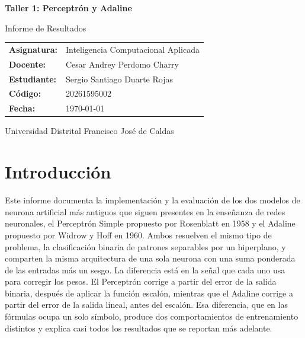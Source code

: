 \documentclass[11pt,letterpaper]{article}
\newcommand{\nombreEstudiante}{Sergio Santiago Duarte Rojas}
\newcommand{\codigoEstudiante}{20261595002}
\newcommand{\nombreDocente}{Cesar Andrey Perdomo Charry}
\newcommand{\nombreAsignatura}{Inteligencia Computacional Aplicada}
\newcommand{\fechaInforme}{\today}
\begin{document}
\begin{titlepage}
    \centering
    \vspace*{2cm}
    {\LARGE \bfseries Taller 1: Perceptrón y Adaline\par}
    \vspace{0.5cm}
    {\large Informe de Resultados\par}
    \vspace{2cm}

    \begin{tabular}{ll}
        \textbf{Asignatura:} & \nombreAsignatura \\
        \textbf{Docente:}    & \nombreDocente \\
        \textbf{Estudiante:} & \nombreEstudiante \\
        \textbf{Código:}     & \codigoEstudiante \\
        \textbf{Fecha:}      & \fechaInforme \\
    \end{tabular}

    \vfill
    Universidad Distrital Francisco José de Caldas
\end{titlepage}

\tableofcontents
\newpage

\section{Introducción}

Este informe documenta la implementación y la evaluación de los dos modelos de neurona artificial más antiguos que siguen presentes en la enseñanza de redes neuronales, el Perceptrón Simple propuesto por Rosenblatt en 1958 y el Adaline propuesto por Widrow y Hoff en 1960. Ambos resuelven el mismo tipo de problema, la clasificación binaria de patrones separables por un hiperplano, y comparten la misma arquitectura de una sola neurona con una suma ponderada de las entradas más un sesgo. La diferencia está en la señal que cada uno usa para corregir los pesos. El Perceptrón corrige a partir del error de la salida binaria, después de aplicar la función escalón, mientras que el Adaline corrige a partir del error de la salida lineal, antes del escalón. Esa diferencia, que en las fórmulas ocupa un solo símbolo, produce dos comportamientos de entrenamiento distintos y explica casi todos los resultados que se reportan más adelante.
\end{document}
